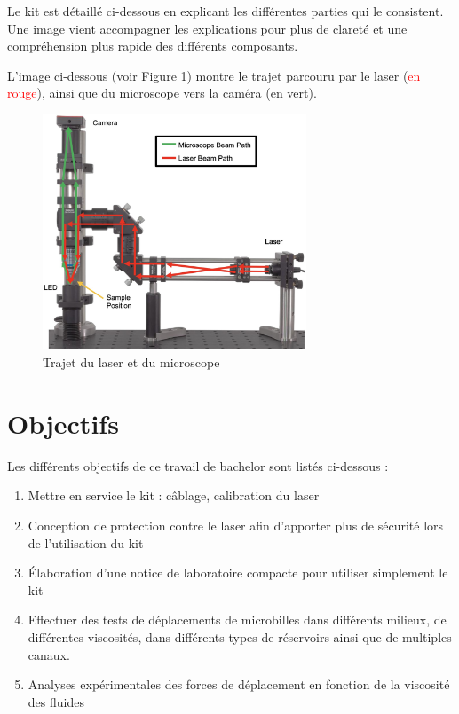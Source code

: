 Le kit est détaillé ci-dessous en explicant les différentes parties qui le consistent. Une image vient accompagner les explications pour plus de clareté et une compréhension plus rapide des différents composants.

L'image ci-dessous (voir Figure \ref{chemin_laser_caméra}) montre le trajet parcouru par le laser (\textcolor{red}{en rouge}), ainsi que du microscope vers la caméra (\textcolor[RGB]{0, 120, 0}{en vert}).

\begin{figure}[H]
    \begin{center}
        \includegraphics[width=0.7\textwidth]{assets/figures/figures_introduction/chemin_laser_camera.jpeg}
    \end{center}
    \caption{Trajet du laser et du microscope}
    \label{chemin_laser_caméra}
\end{figure}

\section{Objectifs}

Les différents objectifs de ce travail de bachelor sont listés ci-dessous :
\begin{enumerate}
    \item Mettre en service le kit : câblage, calibration du laser
    \item Conception de protection contre le laser afin d'apporter plus de sécurité lors de l'utilisation du kit
    \item Élaboration d'une notice de laboratoire compacte pour utiliser simplement le kit
    \item Effectuer des tests de déplacements de microbilles dans différents milieux, de différentes viscosités, dans différents types de réservoirs ainsi que de multiples canaux.
    \item Analyses expérimentales des forces de déplacement en fonction de la viscosité des fluides
\end{enumerate}


